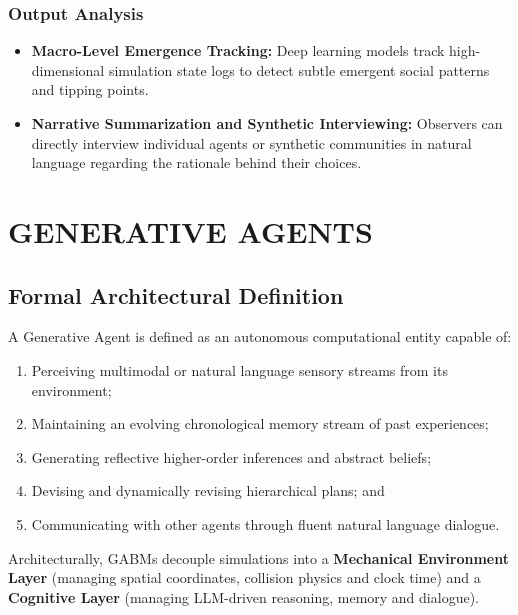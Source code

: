 \documentclass[12pt,a4paper]{report}
\begin{document}
\subsection{Output Analysis}
\begin{itemize}
    \item \textbf{Macro-Level Emergence Tracking:} Deep learning models track high-dimensional simulation state logs to detect subtle emergent social patterns and tipping points.
    \item \textbf{Narrative Summarization and Synthetic Interviewing:} Observers can directly interview individual agents or synthetic communities in natural language regarding the rationale behind their choices.
\end{itemize}


\chapter{GENERATIVE AGENTS}
\label{chap:generative_agents}

\section{Formal Architectural Definition}
\label{sec:ga_def}

A Generative Agent is defined as an autonomous computational entity capable of:
\begin{enumerate}[label=\arabic*.]
    \item Perceiving multimodal or natural language sensory streams from its environment;
    \item Maintaining an evolving chronological memory stream of past experiences;
    \item Generating reflective higher-order inferences and abstract beliefs;
    \item Devising and dynamically revising hierarchical plans; and
    \item Communicating with other agents through fluent natural language dialogue.
\end{enumerate}

Architecturally, GABMs decouple simulations into a \textbf{Mechanical Environment Layer} (managing spatial coordinates, collision physics and clock time) and a \textbf{Cognitive Layer} (managing LLM-driven reasoning, memory and dialogue).
\end{document}
